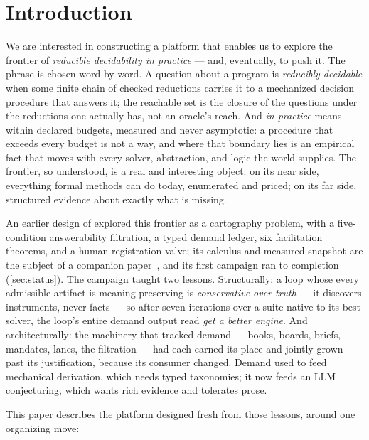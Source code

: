 
\section{Introduction}
\label{sec:intro}

We are interested in constructing a platform that enables us to
explore the frontier of \emph{reducible decidability in practice} ---
and, eventually, to push it. The phrase is chosen word by word. A
question about a program is \emph{reducibly decidable} when some
finite chain of checked reductions carries it to a mechanized
decision procedure that answers it; the reachable set is the closure
of the questions under the reductions one actually has, not an
oracle's reach. And \emph{in practice} means within declared budgets,
measured and never asymptotic: a procedure that exceeds every budget
is not a way, and where that boundary lies is an empirical fact that
moves with every solver, abstraction, and logic the world supplies.
The frontier, so understood, is a real and interesting object: on its
near side, everything formal methods can do today, enumerated and
priced; on its far side, structured evidence about exactly what is
missing.

An earlier design of \hg{} explored this frontier as a cartography
problem, with a five-condition answerability filtration, a typed
demand ledger, six facilitation theorems, and a human registration
valve; its calculus and measured snapshot are the subject of a
companion paper~\citep{hurdygurdy2026calculus}, and its first
campaign ran to completion (\cref{sec:status}). The campaign taught
two lessons. Structurally: a loop whose every admissible artifact is
meaning-preserving is \emph{conservative over truth} --- it discovers
instruments, never facts --- so after seven iterations over a suite
native to its best solver, the loop's entire demand output read
\emph{get a better engine}. And architecturally: the machinery that
tracked demand --- books, boards, briefs, mandates, lanes, the
filtration --- had each earned its place and jointly grown past its
justification, because its consumer changed. Demand used to feed
mechanical derivation, which needs typed taxonomies; it now feeds an
LLM conjecturing, which wants rich evidence and tolerates prose.

This paper describes the platform designed fresh from those lessons,
around one organizing move:

